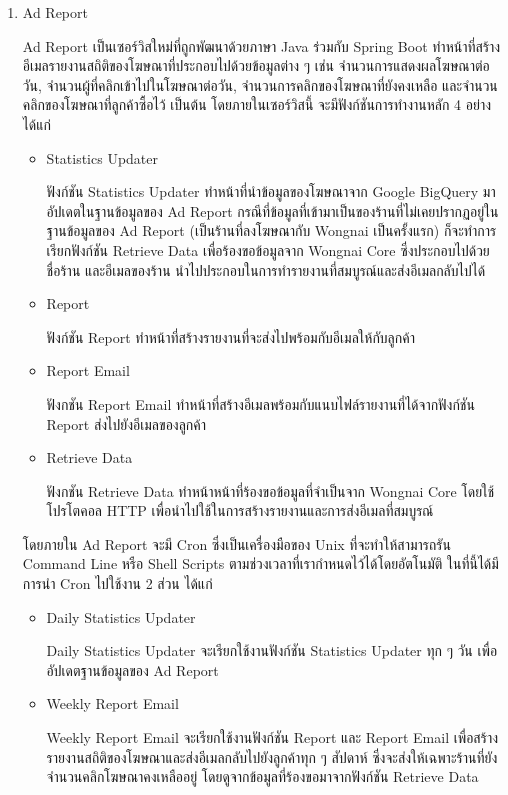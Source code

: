 \begin{enumerate}
	\item Ad Report
	
	Ad Report เป็นเซอร์วิสใหม่ที่ถูกพัฒนาด้วยภาษา Java ร่วมกับ Spring Boot ทำหน้าที่สร้างอีเมลรายงานสถิติของโฆษณาที่ประกอบไปด้วยข้อมูลต่าง ๆ เช่น จำนวนการแสดงผลโฆษณาต่อวัน, จำนวนผู้ที่คลิกเข้าไปในโฆษณาต่อวัน, จำนวนการคลิกของโฆษณาที่ยังคงเหลือ และจำนวนคลิกของโฆษณาที่ลูกค้าซื้อไว้ เป็นต้น โดยภายในเซอร์วิสนี้ จะมีฟังก์ชันการทำงานหลัก 4 อย่าง ได้แก่
	\begin{itemize}
		\item Statistics Updater
		
		 ฟังก์ชัน Statistics Updater ทำหน้าที่นำข้อมูลของโฆษณาจาก Google BigQuery มาอัปเดตในฐานข้อมูลของ Ad Report กรณีที่ข้อมูลที่เข้ามาเป็นของร้านที่ไม่เคยปรากฏอยู่ในฐานข้อมูลของ Ad Report (เป็นร้านที่ลงโฆษณากับ Wongnai เป็นครั้งแรก) ก็จะทำการเรียกฟังก์ชัน Retrieve Data เพื่อร้องขอข้อมูลจาก Wongnai Core ซึ่งประกอบไปด้วยชื่อร้าน และอีเมลของร้าน นำไปประกอบในการทำรายงานที่สมบูรณ์และส่งอีเมลกลับไปได้
		\item Report
		
		ฟังก์ชัน Report ทำหน้าที่สร้างรายงานที่จะส่งไปพร้อมกับอีเมลให้กับลูกค้า
		\item Report Email
		
		ฟังกชัน Report Email ทำหน้าที่สร้างอีเมลพร้อมกับแนบไฟล์รายงานที่ได้จากฟังก์ชัน Report ส่งไปยังอีเมลของลูกค้า
		\item Retrieve Data
		
		ฟังกชัน Retrieve Data ทำหน้าหน้าที่ร้องขอข้อมูลที่จำเป็นจาก Wongnai Core โดยใช้โปรโตคอล HTTP เพื่อนำไปใช้ในการสร้างรายงานและการส่งอีเมลที่สมบูรณ์
	\end{itemize}
	โดยภายใน Ad Report จะมี Cron ซึ่งเป็นเครื่องมือของ Unix ที่จะทำให้สามารถรัน Command Line หรือ Shell Scripts ตามช่วงเวลาที่เรากำหนดไว้ได้โดยอัตโนมัติ ในที่นี้ได้มีการนำ Cron ไปใช้งาน 2 ส่วน ได้แก่
	\begin{itemize}
		\item Daily Statistics Updater
		
		Daily Statistics Updater จะเรียกใช้งานฟังก์ชัน Statistics Updater ทุก ๆ วัน เพื่ออัปเดตฐานข้อมูลของ Ad Report
		\item Weekly Report Email
		
		Weekly Report Email จะเรียกใช้งานฟังก์ชัน Report และ Report Email เพื่อสร้างรายงานสถิติของโฆษณาและส่งอีเมลกลับไปยังลูกค้าทุก ๆ สัปดาห์ ซึ่งจะส่งให้เฉพาะร้านที่ยังจำนวนคลิกโฆษณาคงเหลืออยู่ โดยดูจากข้อมูลที่ร้องขอมาจากฟังก์ชัน Retrieve Data
	\end{itemize}
\end{enumerate}


